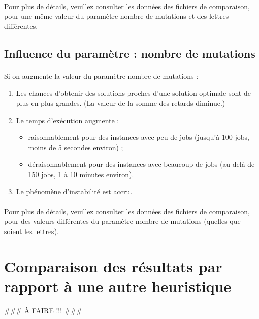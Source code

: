 \paragraph{}
Pour plus de détails, veuillez consulter les données des fichiers de comparaison, pour une même valeur du paramètre \og nombre de mutations \fg{}
et des lettres différentes.

\subsection{Influence du paramètre : nombre de mutations}

\paragraph{}
Si on augmente la valeur du paramètre \og nombre de mutations \fg{} :
\begin{enumerate}
\item Les chances d'obtenir des solutions proches d'une solution optimale sont de plus en plus grandes. (La valeur de la somme des retards diminue.)
\item Le temps d'exécution augmente :
    \begin{itemize}
    \item raisonnablement pour des instances avec peu de jobs (jusqu'à 100 jobs, moins de 5 secondes environ) ;
    \item déraisonnablement pour des instances avec beaucoup de jobs (au-delà de 150 jobs, 1 à 10 minutes environ).
    \end{itemize}
\item Le phénomène d'instabilité est accru.
\end{enumerate}

\paragraph{}
Pour plus de détails, veuillez consulter les données des fichiers de comparaison, pour des valeurs différentes du paramètre \og nombre de mutations \fg{} (quelles que soient les lettres).


\section{Comparaison des résultats par rapport à une autre heuristique}

\#\#\# À FAIRE !!! \#\#\#